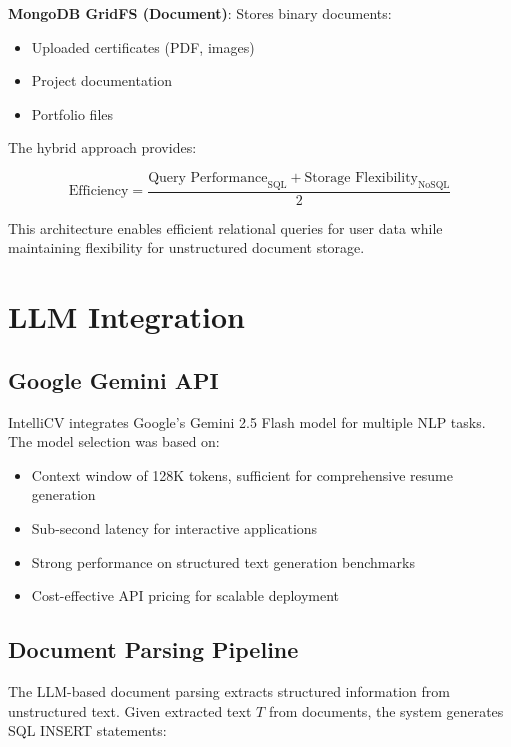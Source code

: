 \documentclass[conference]{IEEEtran}
\begin{document}
\textbf{MongoDB GridFS (Document)}: Stores binary documents:
\begin{itemize}
    \item Uploaded certificates (PDF, images)
    \item Project documentation
    \item Portfolio files
\end{itemize}

The hybrid approach provides:

\begin{equation}
\text{Efficiency} = \frac{\text{Query Performance}_{\text{SQL}} + \text{Storage Flexibility}_{\text{NoSQL}}}{2}
\label{eq:efficiency}
\end{equation}

This architecture enables efficient relational queries for user data while maintaining flexibility for unstructured document storage.

\section{LLM Integration}

\subsection{Google Gemini API}

IntelliCV integrates Google's Gemini 2.5 Flash model for multiple NLP tasks. The model selection was based on:

\begin{itemize}
    \item Context window of 128K tokens, sufficient for comprehensive resume generation
    \item Sub-second latency for interactive applications
    \item Strong performance on structured text generation benchmarks
    \item Cost-effective API pricing for scalable deployment
\end{itemize}

\subsection{Document Parsing Pipeline}

The LLM-based document parsing extracts structured information from unstructured text. Given extracted text $T$ from documents, the system generates SQL INSERT statements:
\end{document}
